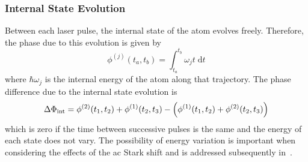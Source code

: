 \subsubsection{Internal State Evolution}
Between each laser pulse, the internal state of the atom evolves freely. Therefore, the
phase due to this evolution is given by
\begin{equation}
  \label{eq:internal_evolution}
  \phi^{(j)}(t_a,t_b) = \int_{t_a}^{t_b} \omega_j t\;\mathrm{d} t
\end{equation}
where $\hbar \omega_j$ is the internal energy of the atom along that
trajectory. The phase difference due to the internal state evolution
is 
\begin{equation}
  \label{eq:phase_internal}
  \Delta \Phi_\textnormal{int} = \phi^{(2)}(t_1,t_2) +
  \phi^{(1)}(t_2,t_3) - \left(\phi^{(1)}(t_1,t_2) + \phi^{(2)}(t_2,t_3)\right)
\end{equation}
which is zero if the time between successive pulses is the same and
the energy of each state does not vary. The possibility of energy
variation is important
when considering the effects of the ac Stark shift and is addressed
subsequently in~.

